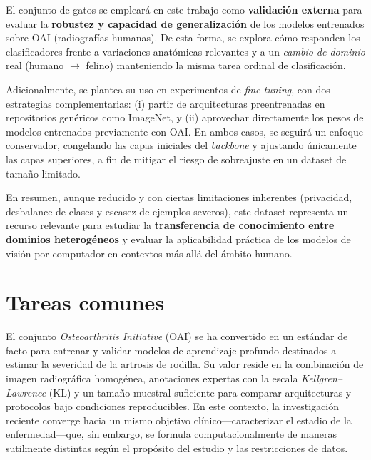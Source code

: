 \documentclass[11pt,spanish,listoffigures,listoftables]{tfgetsinf}
\begin{document}
El conjunto de gatos se empleará en este trabajo como \textbf{validación
	externa} para evaluar la \textbf{robustez y capacidad de generalización} de los
modelos entrenados sobre OAI (radiografías humanas). De esta forma, se explora
cómo responden los clasificadores frente a variaciones anatómicas relevantes y
a un \emph{cambio de dominio} real (humano $\rightarrow$ felino) manteniendo la
misma tarea ordinal de clasificación.

Adicionalmente, se plantea su uso en experimentos de \emph{fine-tuning}, con
dos estrategias complementarias: (i) partir de arquitecturas preentrenadas en
repositorios genéricos como ImageNet, y (ii) aprovechar directamente los pesos
de modelos entrenados previamente con OAI. En ambos casos, se seguirá un
enfoque conservador, congelando las capas iniciales del \emph{backbone} y
ajustando únicamente las capas superiores, a fin de mitigar el riesgo de
sobreajuste en un dataset de tamaño limitado.

En resumen, aunque reducido y con ciertas limitaciones inherentes (privacidad,
desbalance de clases y escasez de ejemplos severos), este dataset representa un
recurso relevante para estudiar la \textbf{transferencia de conocimiento entre
	dominios heterogéneos} y evaluar la aplicabilidad práctica de los modelos de
visión por computador en contextos más allá del ámbito humano.

\section{Tareas comunes}
\label{sec:3_4_tareas_comunes}

El conjunto \emph{Osteoarthritis Initiative} (OAI) se ha convertido en un
estándar de facto para entrenar y validar modelos de aprendizaje profundo
destinados a estimar la severidad de la artrosis de rodilla. Su valor reside en
la combinación de imagen radiográfica homogénea, anotaciones expertas con la
escala \emph{Kellgren--Lawrence} (KL) y un tamaño muestral suficiente para
comparar arquitecturas y protocolos bajo condiciones reproducibles. En este
contexto, la investigación reciente converge hacia un mismo objetivo
clínico—caracterizar el estadio de la enfermedad—que, sin embargo, se formula
computacionalmente de maneras sutilmente distintas según el propósito del
estudio y las restricciones de datos.
\end{document}
